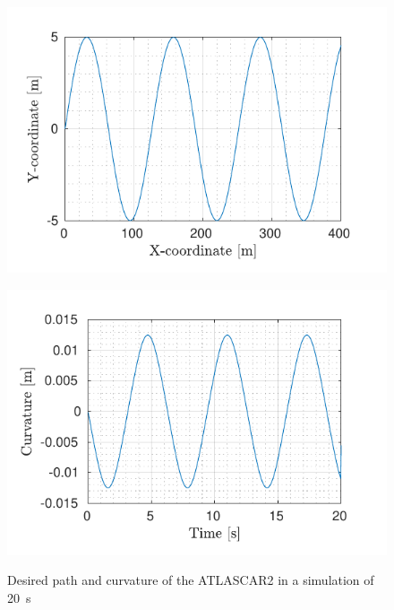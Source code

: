 \begin{figure}[!t]
	\centering
	\begin{minipage}[t]{0.49\textwidth}
		\includegraphics[width=\textwidth]{../../MATLAB/lane_following/figure/Reference.pdf}
		\vspace{-17pt}
		\subcaption{}
		\label{fig:reference_laneFollowing}
	\end{minipage}
	\begin{minipage}[t]{0.5\textwidth}
		\includegraphics[width=\textwidth]{../../MATLAB/lane_following/figure/Curvature.pdf}
		\vspace{-17pt}
		\subcaption{}
		\label{fig:curvature_laneFollowing}
	\end{minipage}
	\caption{Desired path and curvature of the ATLASCAR2 in a simulation of \SI{20}{s}}
	\label{fig:laneFollowing_desired}
	\vspace{-30pt}
\end{figure}

